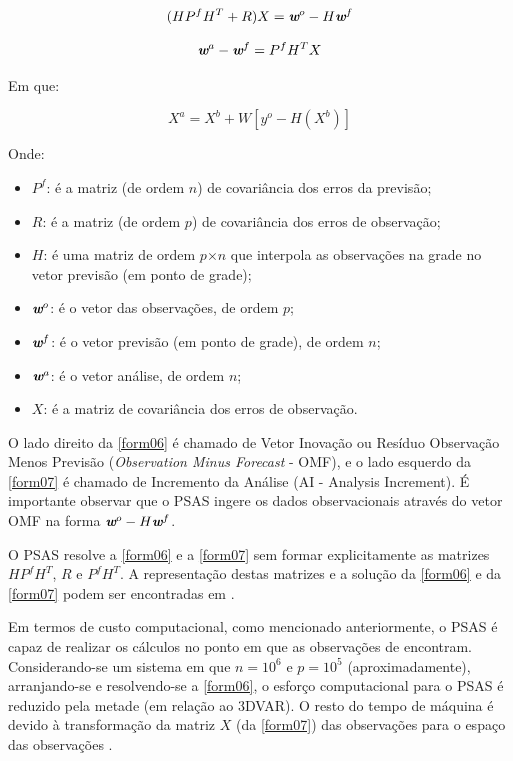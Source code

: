 \begin{equation}
(HP^{f}H^{T}+R)X=\textit{\textbf{w}}^o-H\textit{\textbf{w}}^f
\label{form06}
\end{equation}

\begin{equation}
\textit{\textbf{w}}^a-\textit{\textbf{w}}^f=P^{f}H^{T}X
\label{form07}
\end{equation}

Em que:

\begin{equation}
X^{a}=X^{b}+W[y^{o}-H(X^{b})]
\label{form08}
\end{equation}

Onde:

\begin{itemize}
\item $P^{f}$: é a matriz (de ordem $n$) de covariância dos erros da previsão;
\item $R$: é a matriz (de ordem $p$) de covariância dos erros de observação;
\item $H$: é uma matriz de ordem $p$$\times$$n$ que interpola as observações na grade no vetor previsão (em ponto de grade);
\item $\textit{\textbf{w}}^o$: é o vetor das observações, de ordem $p$;
\item $\textit{\textbf{w}}^f$: é o vetor previsão (em ponto de grade), de ordem $n$;
\item $\textit{\textbf{w}}^a$: é o vetor análise, de ordem $n$;
\item $\textit{X}$: é a matriz de covariância dos erros de observação.
\end{itemize}

O lado direito da \autoref{form06} é chamado de Vetor Inovação ou Resíduo Observação Menos Previsão (\textit{Observation Minus Forecast} - OMF), e o lado esquerdo da \autoref{form07} é chamado de Incremento da Análise (AI - Analysis Increment). É importante observar que o PSAS ingere os dados observacionais através do vetor OMF na forma $\textit{\textbf{w}}^o-H\textit{\textbf{w}}^f$.

O PSAS resolve a \autoref{form06} e a \autoref{form07} sem formar explicitamente as matrizes $HP^{f}H^{T}$, $R$ e $P^{f}H^{T}$. A representação destas matrizes e a solução da \autoref{form06} e da \autoref{form07} podem ser encontradas em \cite{guoetal98}.

Em termos de custo computacional, como mencionado anteriormente, o PSAS é capaz de realizar os cálculos no ponto em que as observações de encontram. Considerando-se um sistema em que $n=10^{6}$ e $p=10^{5}$ (aproximadamente), arranjando-se e resolvendo-se a \autoref{form06}, o esforço computacional para o PSAS é reduzido pela metade (em relação ao 3DVAR). O resto do tempo de máquina é devido à transformação da matriz $X$ (da \autoref{form07}) das observações para o espaço das observações \cite{cohnetal98}.

